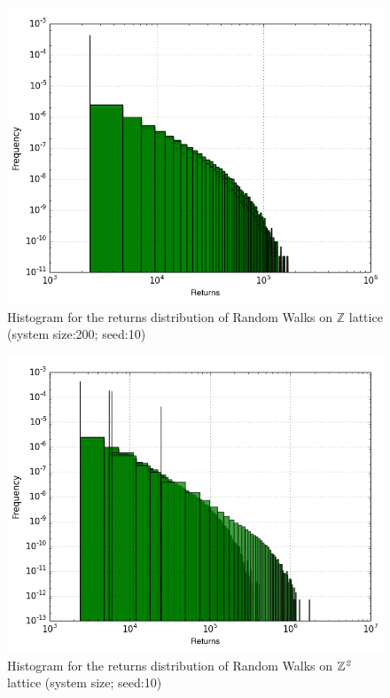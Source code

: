 \documentclass{article}
\begin{document}
\begin{figure}[H]
	\centering
		\includegraphics[scale=0.5]{RW1D_cluster_sizes_200_histogram}
		\caption{Histogram for the returns distribution of Random Walks on $\mathbb{Z}$ lattice (system size:200; seed:10)}
		\label{fig:RW1Dhdish}
\end{figure}
\begin{figure}[h]
	\centering
		\includegraphics[scale=0.5]{RW2D_cluster_sizes_200_histogram}
		\caption{Histogram for the returns distribution of Random Walks on $\mathbb{Z}^{\emph{2}}$ lattice (system size; seed:10)}
		\label{fig:RW2Dhdish}
\end{figure}
\newpage
\end{document}
